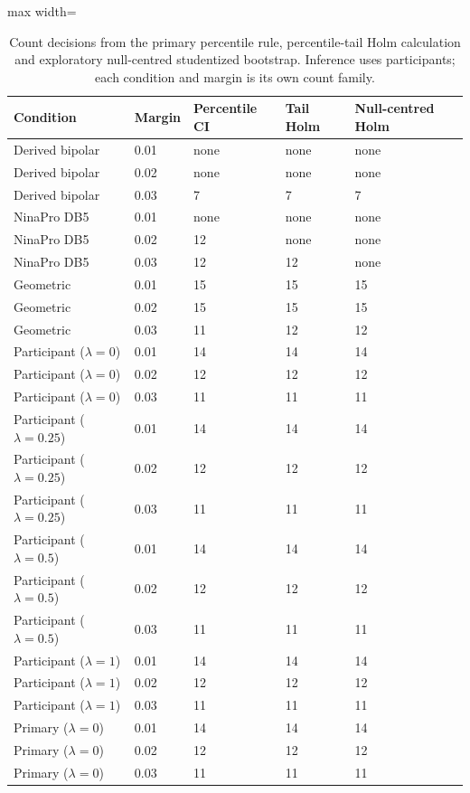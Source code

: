 \begin{table}[htbp]
\centering\small
\caption{Count decisions from the primary percentile rule, percentile-tail Holm calculation and exploratory null-centred studentized bootstrap. Inference uses participants; each condition and margin is its own count family.}\label{tab:countinference}
\begin{adjustbox}{max width=\textwidth}
\begin{tabular}{lllll}\toprule
Condition & Margin & Percentile CI & Tail Holm & Null-centred Holm\\\midrule
Derived bipolar & 0.01 & none & none & none\\
Derived bipolar & 0.02 & none & none & none\\
Derived bipolar & 0.03 & 7 & 7 & 7\\
NinaPro DB5 & 0.01 & none & none & none\\
NinaPro DB5 & 0.02 & 12 & none & none\\
NinaPro DB5 & 0.03 & 12 & 12 & none\\
Geometric & 0.01 & 15 & 15 & 15\\
Geometric & 0.02 & 15 & 15 & 15\\
Geometric & 0.03 & 11 & 12 & 12\\
Participant ($\lambda=0$) & 0.01 & 14 & 14 & 14\\
Participant ($\lambda=0$) & 0.02 & 12 & 12 & 12\\
Participant ($\lambda=0$) & 0.03 & 11 & 11 & 11\\
Participant ($\lambda=0.25$) & 0.01 & 14 & 14 & 14\\
Participant ($\lambda=0.25$) & 0.02 & 12 & 12 & 12\\
Participant ($\lambda=0.25$) & 0.03 & 11 & 11 & 11\\
Participant ($\lambda=0.5$) & 0.01 & 14 & 14 & 14\\
Participant ($\lambda=0.5$) & 0.02 & 12 & 12 & 12\\
Participant ($\lambda=0.5$) & 0.03 & 11 & 11 & 11\\
Participant ($\lambda=1$) & 0.01 & 14 & 14 & 14\\
Participant ($\lambda=1$) & 0.02 & 12 & 12 & 12\\
Participant ($\lambda=1$) & 0.03 & 11 & 11 & 11\\
Primary ($\lambda=0$) & 0.01 & 14 & 14 & 14\\
Primary ($\lambda=0$) & 0.02 & 12 & 12 & 12\\
Primary ($\lambda=0$) & 0.03 & 11 & 11 & 11\\

\end{tabular}
\end{adjustbox}
\end{table}

